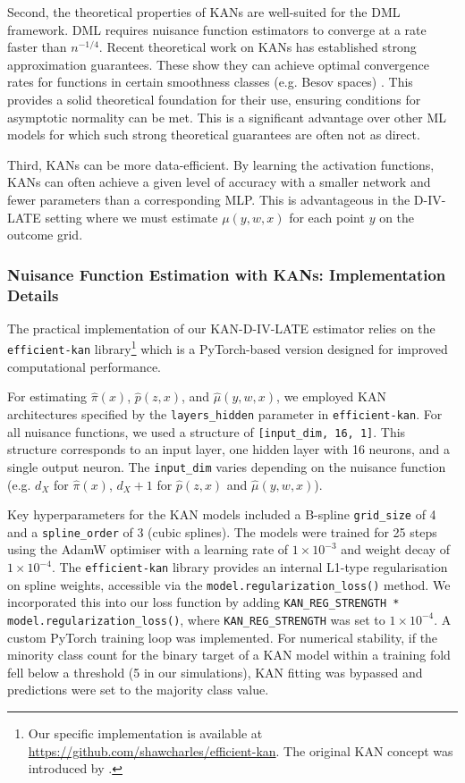 \documentclass[final,3p,fleqn, 10pt]{elsarticle}
\begin{document}
Second, the theoretical properties of KANs are well-suited for the DML framework. DML requires nuisance function estimators to converge at a rate faster than $n^{-1/4}$. Recent theoretical work on KANs has established strong approximation guarantees. These show they can achieve optimal convergence rates for functions in certain smoothness classes (e.g. Besov spaces) \citep{kratsios2025kolmogorov}. This provides a solid theoretical foundation for their use, ensuring conditions for asymptotic normality can be met. This is a significant advantage over other ML models for which such strong theoretical guarantees are often not as direct.

Third, KANs can be more data-efficient. By learning the activation functions, KANs can often achieve a given level of accuracy with a smaller network and fewer parameters than a corresponding MLP. This is advantageous in the D-IV-LATE setting where we must estimate $\mu(y, w, x)$ for each point $y$ on the outcome grid.

\subsubsection{Nuisance Function Estimation with KANs: Implementation Details}
\label{subsubsec:kans_implementation}
The practical implementation of our KAN-D-IV-LATE estimator relies on the \texttt{efficient-kan} library\footnote{Our specific implementation is available at \url{https://github.com/shawcharles/efficient-kan}. The original KAN concept was introduced by \citet{liu2024kan}.} which is a PyTorch-based version designed for improved computational performance.

For estimating $\hat{\pi}(x)$, $\hat{p}(z,x)$, and $\hat{\mu}(y,w,x)$, we employed KAN architectures specified by the \texttt{layers\_hidden} parameter in \texttt{efficient-kan}. For all nuisance functions, we used a structure of \texttt{[input\_dim, 16, 1]}. This structure corresponds to an input layer, one hidden layer with 16 neurons, and a single output neuron. The \texttt{input\_dim} varies depending on the nuisance function (e.g. $d_X$ for $\hat{\pi}(x)$, $d_X+1$ for $\hat{p}(z,x)$ and $\hat{\mu}(y,w,x)$).

Key hyperparameters for the KAN models included a B-spline \texttt{grid\_size} of 4 and a \texttt{spline\_order} of 3 (cubic splines). The models were trained for 25 steps using the AdamW optimiser with a learning rate of $1 \times 10^{-3}$ and weight decay of $1 \times 10^{-4}$. The \texttt{efficient-kan} library provides an internal L1-type regularisation on spline weights, accessible via the \texttt{model.regularization\_loss()} method. We incorporated this into our loss function by adding \texttt{KAN\_REG\_STRENGTH * model.regularization\_loss()}, where \texttt{KAN\_REG\_STRENGTH} was set to $1 \times 10^{-4}$. A custom PyTorch training loop was implemented. For numerical stability, if the minority class count for the binary target of a KAN model within a training fold fell below a threshold (5 in our simulations), KAN fitting was bypassed and predictions were set to the majority class value.
\end{document}
